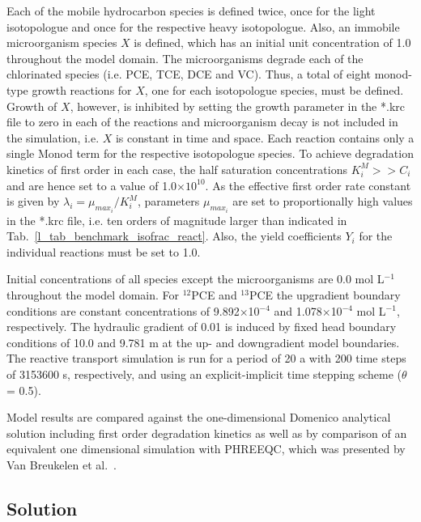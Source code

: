 Each of the mobile hydrocarbon species is defined twice, once for the light isotopologue and once for the respective heavy isotopologue. Also, an immobile microorganism species $X$ is defined, which has an initial unit concentration of 1.0 throughout the model domain. The microorganisms degrade each of the chlorinated species (i.e. PCE, TCE, DCE and VC). Thus, a total of eight monod-type growth reactions for $X$, one for each isotopologue species, must be defined. Growth of $X$, however, is inhibited by setting the growth parameter in the *.krc file to zero in each of the reactions and microorganism decay is not included in the simulation, i.e. $X$ is constant in time and space. Each reaction contains only a single Monod term for the respective isotopologue species. To achieve degradation kinetics of first order in each case, the half saturation concentrations $K^M_i >> C_i$ and are hence set to a value of 1.0$\times 10^{10}$. As the effective first order rate constant is given by $\lambda_i = \mu_{max_i} / K^M_i$, parameters $\mu_{max_i}$ are set to proportionally high values in the *.krc file, i.e. ten orders of magnitude larger than indicated in Tab.~\ref{l_tab_benchmark_isofrac_react}. Also, the yield coefficients $Y_i$ for the individual reactions must be set to 1.0.

Initial concentrations of all species except the microorganisms are 0.0 mol L$^{-1}$ throughout the model domain. For $^{12}$PCE and $^{13}$PCE the upgradient boundary conditions are constant concentrations of 9.892$\times$10$^{-4}$ and 1.078$\times$10$^{-4}$ mol L$^{-1}$, respectively. The hydraulic gradient of 0.01 is induced by fixed head boundary conditions of 10.0 and 9.781 m at the up- and downgradient model boundaries. The reactive transport simulation is run for a period of 20 a with 200 time steps of 3153600 s, respectively, and using an explicit-implicit time stepping scheme ($\theta$ = 0.5).

Model results are compared against the one-dimensional Domenico analytical solution including first order degradation kinetics as well as by comparison of an equivalent one dimensional simulation with PHREEQC, which was presented by Van Breukelen et al.~\cite{VanBr:05}. 

\subsection{Solution}

